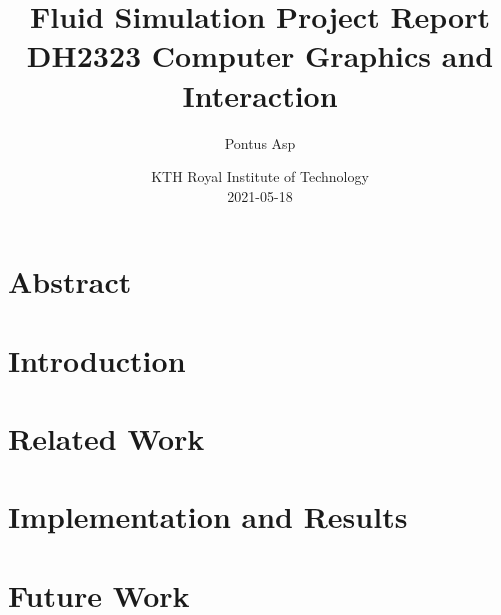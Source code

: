 \documentclass{article}
\title{%
\textbf{Fluid Simulation Project Report}\\%
\large DH2323 Computer Graphics and Interaction}
\author{Pontus Asp}
\date{%
KTH Royal Institute of Technology\\%
2021-05-18}
\begin{document}
\maketitle
\begin{multicols}{2}

\section{Abstract}
\section{Introduction}
\section{Related Work}
\section{Implementation and Results}
\section{Future Work}


\end{multicols}
\end{document}
